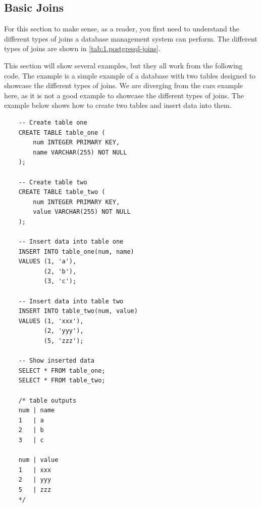 \subsection{Basic Joins}
For this section to make sense, as a reader, you first need to understand the different types of joins a database management system can perform. The different types of joins are shown in \cref{tab:1.postgresql-joins}.

\begin{table}[htb]
    \centering
    \caption{Commonly used joins in PostgreSQL}
    \label{tab:1.postgresql-joins}
\end{table}

This section will show several examples, but they all work from the following code. The example is a simple example of a database with two tables designed to showcase the different types of joins. We are diverging from the cars example here, as it is not a good example to showcase the different types of joins. The example below shows how to create two tables and insert data into them.

\begin{verbatim}
    -- Create table one
    CREATE TABLE table_one (
        num INTEGER PRIMARY KEY,
        name VARCHAR(255) NOT NULL
    );

    -- Create table two
    CREATE TABLE table_two (
        num INTEGER PRIMARY KEY,
        value VARCHAR(255) NOT NULL
    );

    -- Insert data into table one
    INSERT INTO table_one(num, name)
    VALUES (1, 'a'),
           (2, 'b'),
           (3, 'c');

    -- Insert data into table two
    INSERT INTO table_two(num, value)
    VALUES (1, 'xxx'),
           (2, 'yyy'),
           (5, 'zzz');
    
    -- Show inserted data
    SELECT * FROM table_one;
    SELECT * FROM table_two;

    /* table outputs
    num | name
    1   | a
    2   | b
    3   | c
    
    num | value
    1   | xxx
    2   | yyy
    5   | zzz
    */
\end{verbatim}

